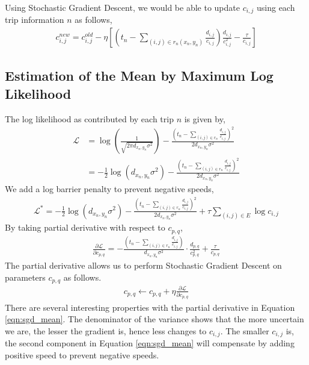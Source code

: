 \documentclass[10pt]{article}
\begin{document}
Using Stochastic Gradient Descent, we would be able to update $c_{i,j}$ using each trip information $n$ as follows,
\begin{gather}
c_{i,j}^{new} = c_{i, j}^{old} - \eta \left[ \left( t_n - \sum_{ (i,j) \in r_n(x_n, y_n) } \frac{d_{i,j}}{c_{i,j}} \right) \frac{d_{i,j}}{c_{i,j}^2} - \frac{\tau}{c_{i,j}} \right]
\end{gather}

\subsection{Estimation of the Mean by Maximum Log Likelihood}

The log likelihood as contributed by each trip $n$ is given by, 
\begin{align}
	\mathcal{L} &= \log \left( \frac{1}{\sqrt{2 \pi d_{x_n, y_n} \sigma^2 }} \right) - \frac{\left( t_n - \sum_{ (i,j) \in r_n } \frac{d_{i,j}}{c_{i,j}} \right)^2}{2 d_{x_n, y_n} \sigma^2 } \nonumber \\
	&= - \frac{1}{2} \log \left( d_{x_n, y_n} \sigma^2 \right) - \frac{\left( t_n - \sum_{ (i,j) \in r_n } \frac{d_{i,j}}{c_{i,j}} \right)^2}{2 d_{x_n, y_n} \sigma^2 }
\end{align}
We add a log barrier penalty to prevent negative speeds, 
\begin{align}
	\mathcal{L^*} = - \frac{1}{2} \log \left( d_{x_n, y_n} \sigma^2 \right) - \frac{\left( t_n - \sum_{ (i,j) \in r_n } \frac{d_{i,j}}{c_{i,j}} \right)^2}{2 d_{x_n, y_n} \sigma^2 } + \tau \sum_{(i,j) \in E} \log c_{i,j}
\end{align}
By taking partial derivative with respect to $c_{p,q}$,
\begin{align}
	\label{eqn:sgd_mean}
	\frac{\partial \mathcal{L}}{\partial c_{p,q}} = - \frac{\left( t_n - \sum_{ (i,j) \in r_n } \frac{d_{i,j}}{c_{i,j}} \right)}{d_{x_n, y_n} \sigma^2 } \cdot \frac{d_{p,q}}{c_{p,q}^2} + \frac{\tau}{c_{p,q}}
\end{align}
The partial derivative allows us to perform Stochastic Gradient Descent on parameters $c_{p,q}$ as follows.
\begin{align}
	c_{p,q} \leftarrow c_{p,q} + \eta \frac{\partial \mathcal{L}}{\partial c_{p,q}}
\end{align}
There are several interesting properties with the partial derivative in Equation \ref{eqn:sgd_mean}. The denominator of the variance shows that the more uncertain we are, the lesser the gradient is, hence less changes to $c_{i,j}$. The smaller $c_{i,j}$ is, the second component in Equation \ref{eqn:sgd_mean} will compensate by adding positive speed to prevent negative speeds.
\end{document}
